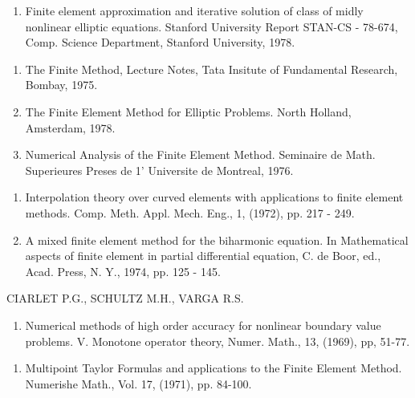 \begin{thebibliography}{99}

  \begin{enumerate}
  \item Finite element approximation and iterative solution of class
 of midly nonlinear elliptic equations. Stanford University Report
 STAN-CS - 78-674, Comp. Science Department, Stanford University,
 1978.\label{k30:e1} 
  \end{enumerate}


  \begin{enumerate}
  \item The Finite Method, Lecture Notes, Tata Insitute of Fundamental
 Research, Bombay, 1975.\label{k31:e1} 

  \item The Finite Element Method for Elliptic Problems. North
 Holland, Amsterdam, 1978.\label{k31:e2} 

  \item Numerical Analysis of the Finite Element Method. Seminaire de
 Math. Superieures Preses de 1' Universite de Montreal, 1976.\label{k31:e3}
  \end{enumerate}


  \begin{enumerate}
  \item  Interpolation theory over curved elements with applications to
 finite element methods. Comp. Meth. Appl. Mech. Eng., 1, (1972),
 pp. 217 - 249.\label{k32:e1} 

  \item A mixed finite element method for the biharmonic equation. In
 Mathematical aspects of finite element in partial differential
 equation, C. de Boor, ed., Acad. Press, N. Y., 1974, pp. 125 -
 145.\label{k32:e2} 
  \end{enumerate}

 {CIARLET P.G., SCHULTZ M.H., VARGA R.S.}

  \begin{enumerate}
  \item Numerical methods of high order accuracy for nonlinear
 boundary value problems. V. Monotone operator theory,
 Numer. Math., 13, (1969), pp, 51-77.\label{k33:e1} 
  \end{enumerate}


  \begin{enumerate}
  \item  Multipoint Taylor Formulas and applications to the Finite
 Element Method. Numerishe Math., Vol. 17, (1971),
 pp. 84-100.\label{k34:e1}  
  \end{enumerate}


\end{thebibliography}
